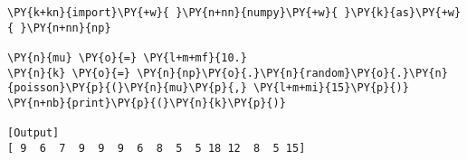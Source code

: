 \begin{Verbatim}[label=\makebox{\href{https://github.com/unipi-physics-labs/statnotes/tree/main/snippy/np.random.poisson.py}{https://github.com/.../np.random.poisson.py}},commandchars=\\\{\}]
\PY{k+kn}{import}\PY{+w}{ }\PY{n+nn}{numpy}\PY{+w}{ }\PY{k}{as}\PY{+w}{ }\PY{n+nn}{np}

\PY{n}{mu} \PY{o}{=} \PY{l+m+mf}{10.}
\PY{n}{k} \PY{o}{=} \PY{n}{np}\PY{o}{.}\PY{n}{random}\PY{o}{.}\PY{n}{poisson}\PY{p}{(}\PY{n}{mu}\PY{p}{,} \PY{l+m+mi}{15}\PY{p}{)}
\PY{n+nb}{print}\PY{p}{(}\PY{n}{k}\PY{p}{)}

[Output]
[ 9  6  7  9  9  9  6  8  5  5 18 12  8  5 15]
\end{Verbatim}
